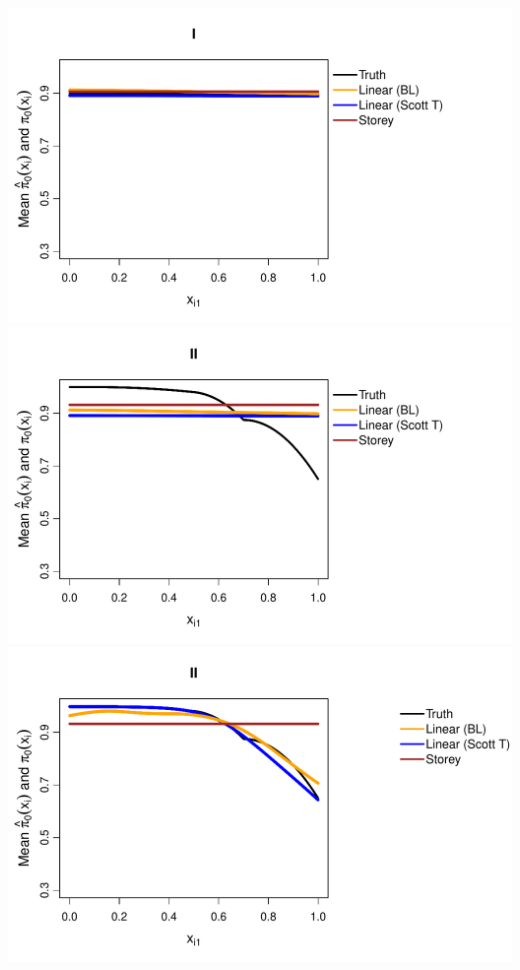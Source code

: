 \documentclass{article}\usepackage[]{graphicx}\usepackage[]{color}
\makeatletter
\def\maxwidth{ %
  \ifdim\Gin@nat@width>\linewidth
    \linewidth
  \else
    \Gin@nat@width
  \fi
}
\newenvironment{knitrout}{}{} %
\makeatother
\begin{document}
\begin{knitrout}
{\centering \includegraphics[width=\maxwidth]{Figures/plot_of_mean_estimates_norm_10000-1} 
\includegraphics[width=\maxwidth]{Figures/plot_of_mean_estimates_norm_10000-2} 
\includegraphics[width=\maxwidth]{Figures/plot_of_mean_estimates_norm_10000-3} 
}
\end{knitrout}
\end{document}
